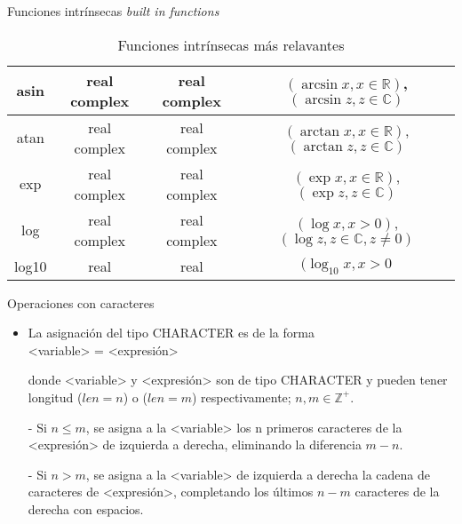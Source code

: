 \begin{frame}[fragile]{Funciones intrínsecas \textit{built in functions}}
\begin{table}[]
{\begin{tabular}{|c|c|c|c|}
    asin            & real complex                  & real complex      & $(\arcsin x, x \in \mathbb{R})$, $(\arcsin z, z \in \mathbb{C})$  \\ \hline 
    atan            & real complex                  & real complex      & $(\arctan x, x \in \mathbb{R})$, $(\arctan z, z \in \mathbb{C})$     \\ \hline 
    exp             & real complex                  & real complex      & $(\exp x, x \in \mathbb{R})$, $(\exp z, z \in \mathbb{C})$        \\ \hline 
    log             & real complex                  & real complex      & $(\log x, x > 0)$, $(\log z, z \in \mathbb{C}, z \neq 0)$          \\ \hline 
    log10           & real                          & real              & $(\log_{10} x, x > 0$                                             \\ \hline 
    \end{tabular}}
    \caption*{Funciones intrínsecas más relavantes}
    \end{table}
\end{frame}


\begin{frame}[fragile]{Operaciones con caracteres}
     \begin{itemize}[<+(0)->] 
    \item La asignación del tipo CHARACTER es de la forma \\
      \centering <variable> = <expresión>\\ 
    \item [] donde <variable> y <expresión> son de tipo CHARACTER y pueden tener longitud ($len = n$) o ($len = m$) respectivamente; $n, m \in \mathbb{Z}^{+}$. 
    \vspace{0.2cm}
    \item [-] Si $n \leq m$, se asigna a la <variable> los n primeros caracteres de la <expresión> de izquierda a derecha, eliminando la diferencia $m-n$.
    \item [-] Si $n > m$, se asigna a la <variable> de izquierda a derecha la cadena de caracteres de <expresión>, completando los últimos $n-m$ caracteres de la derecha con espacios. 
     \end{itemize}

\end{frame}

